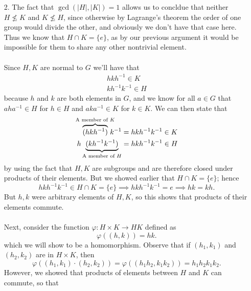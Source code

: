 \documentclass[12pt,letterpaper]{algebra_book}
\renewcommand{\phi}{\varphi}
\theoremstyle{definition}
\begin{document}
\begin{prf}
\begin{itemize}
            \item[2.]The fact that $\gcd(|H|,|K|)=1$ allows us to concldue that neither 
            $H \not \le K$ and $K \not \le H$, since otherwise by Lagrange's theorem 
            the order of one group would divide the other, and obviously we don't have 
            that case here. Thus we know that $H \cap K = \{e\}$, as by our previous 
            argument it would be impossible for them to share any other nontrivial element.
            \\
            \\
            Since $H, K$ are 
            normal to $G$ we'll have that 
            \begin{align*}
                hkh^{-1} \in K\\
                kh^{-1}k^{-1} \in H
            \end{align*}
            because $h$ and $k$ are both elements in $G$, and we know 
            for all $a \in G$ that $aha^{-1} \in H$ for $h \in H$ and 
            $aka^{-1} \in K$ for $k \in K$.
            We can then state that 
            \begin{align*}
                \overbrace{(hkh^{-1})}^{\text{A member of }K} \hspace{-0.3cm}k^{-1} = hkh^{-1}k^{-1} \in K\\
                h\underbrace{(kh^{-1}k^{-1})}_{\text{A member of } H} = hkh^{-1}k^{-1} \in H
            \end{align*}
            by using the fact that $H, K$ are subgroups and are therefore closed under products 
            of their elements. But we showed earlier that $H \cap K = \{e\}$; hence 
            $$
            hkh^{-1}k^{-1} \in H \cap K = \{e\} \implies hkh^{-1}k^{-1} = e \implies hk = kh.
            $$
            But $h, k$ were arbitrary elements of $H, K$, so this shows that products of 
            their elements commute.
            \\
            \\
            Next, consider the function $\phi: H \times K \rightarrow
            HK$ defined as
            $$
            \phi((h, k)) = hk.
            $$
            which we will 
            show to be a homomorphism.
            Observe that if $(h_1, k_1)$ and $(h_2, k_2)$ are in $H \times K$, then 
            $$
            \phi((h_1, k_1)\cdot(h_2, k_2)) = \phi((h_1h_2, k_1k_2)) = h_1h_2k_1k_2.
            $$
            However, we showed that products of elements between $H$ and $K$ can commute, so that 

\end{itemize}
\end{prf}
\end{document}
